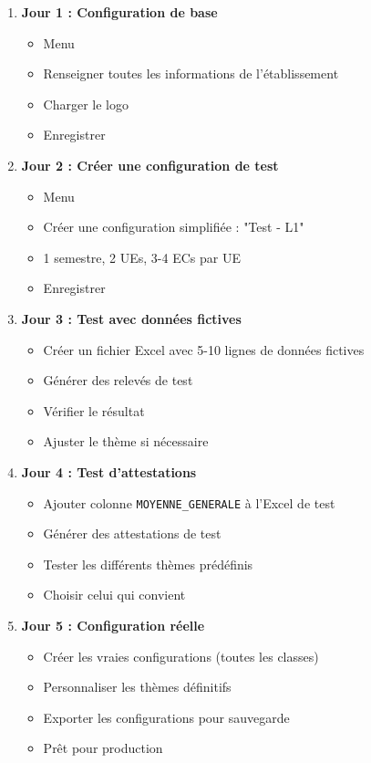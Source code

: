 \begin{enumerate}[leftmargin=*]
    \item \textbf{Jour 1 : Configuration de base}
    \begin{itemize}
        \item Menu 
        \item Renseigner toutes les informations de l'établissement
        \item Charger le logo
        \item Enregistrer
    \end{itemize}

    \item \textbf{Jour 2 : Créer une configuration de test}
    \begin{itemize}
        \item Menu 
        \item Créer une configuration simplifiée : "Test - L1"
        \item 1 semestre, 2 UEs, 3-4 ECs par UE
        \item Enregistrer
    \end{itemize}

    \item \textbf{Jour 3 : Test avec données fictives}
    \begin{itemize}
        \item Créer un fichier Excel avec 5-10 lignes de données fictives
        \item Générer des relevés de test
        \item Vérifier le résultat
        \item Ajuster le thème si nécessaire
    \end{itemize}

    \item \textbf{Jour 4 : Test d'attestations}
    \begin{itemize}
        \item Ajouter colonne \texttt{MOYENNE\_GENERALE} à l'Excel de test
        \item Générer des attestations de test
        \item Tester les différents thèmes prédéfinis
        \item Choisir celui qui convient
    \end{itemize}

    \item \textbf{Jour 5 : Configuration réelle}
    \begin{itemize}
        \item Créer les vraies configurations (toutes les classes)
        \item Personnaliser les thèmes définitifs
        \item Exporter les configurations pour sauvegarde
        \item Prêt pour production
    \end{itemize}
\end{enumerate}

